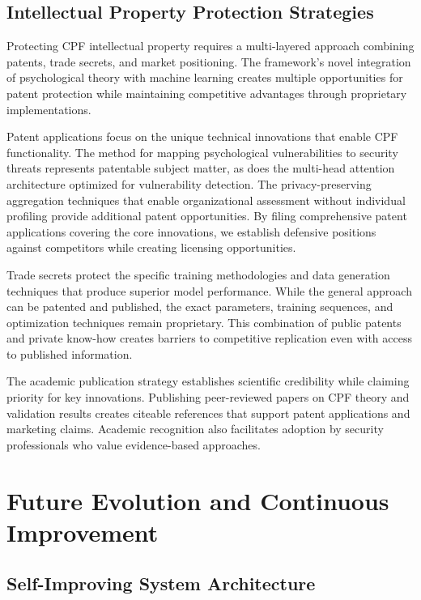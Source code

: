 \documentclass[11pt,a4paper]{article}
\begin{document}
\subsection{Intellectual Property Protection Strategies}

Protecting CPF intellectual property requires a multi-layered approach combining patents, trade secrets, and market positioning. The framework's novel integration of psychological theory with machine learning creates multiple opportunities for patent protection while maintaining competitive advantages through proprietary implementations.

Patent applications focus on the unique technical innovations that enable CPF functionality. The method for mapping psychological vulnerabilities to security threats represents patentable subject matter, as does the multi-head attention architecture optimized for vulnerability detection. The privacy-preserving aggregation techniques that enable organizational assessment without individual profiling provide additional patent opportunities. By filing comprehensive patent applications covering the core innovations, we establish defensive positions against competitors while creating licensing opportunities.

Trade secrets protect the specific training methodologies and data generation techniques that produce superior model performance. While the general approach can be patented and published, the exact parameters, training sequences, and optimization techniques remain proprietary. This combination of public patents and private know-how creates barriers to competitive replication even with access to published information.

The academic publication strategy establishes scientific credibility while claiming priority for key innovations. Publishing peer-reviewed papers on CPF theory and validation results creates citeable references that support patent applications and marketing claims. Academic recognition also facilitates adoption by security professionals who value evidence-based approaches.

\section{Future Evolution and Continuous Improvement}

\subsection{Self-Improving System Architecture}
\end{document}
